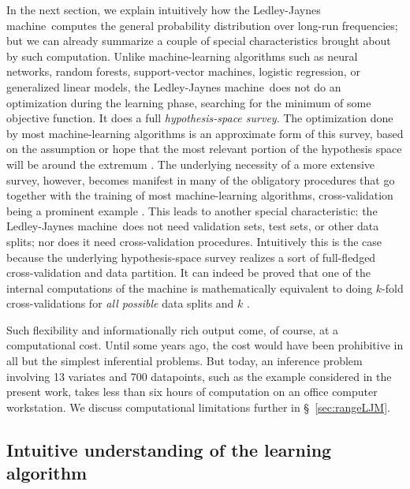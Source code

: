 \documentclass[utf8]{FrontiersinHarvard} %
\newcommand*{\sect}{\S}%
\newcommand*{\sects}{\S\S}%
\newcommand*{\chap}{ch.}%
\renewcommand*{\|}[1][]{\nonscript\:#1\vert\nonscript\:\mathopen{}}
\newcommand*{\ljm}{Ledley-Jaynes machine}
\begin{document}
In the next section, we explain intuitively how the \ljm\ computes the general probability distribution over long-run frequencies; but we can already summarize a couple of special characteristics brought about by such computation. Unlike machine-learning algorithms such as neural networks, random forests, support-vector machines, logistic regression, or generalized linear models, the \ljm\ does not do an optimization during the learning phase, searching for the minimum of some objective function. It does a full \emph{hypothesis-space survey}. %
The optimization done by most machine-learning algorithms is an approximate form of this survey, based on the assumption or hope that the most relevant portion of the hypothesis space will be around the extremum \citetext{\citealp[\chap~16]{mackay1992,murphy2012}; \citealp[see also][]{selfetal1987}}. The underlying necessity of a more extensive survey, however, becomes manifest in many of the obligatory procedures that go together with the training of most machine-learning algorithms, cross-validation being a prominent example \citep{mackay1992b}. This leads to another special characteristic: the \ljm\ does not need validation sets, test sets, or other data splits; nor does it need cross-validation procedures. Intuitively this is the case because the underlying hypothesis-space survey realizes a sort of full-fledged cross-validation and data partition. It can indeed be proved that one of the internal computations of the machine is mathematically equivalent to doing $k$-fold cross-validations for \emph{all possible} data splits and $k$ \citep{portamana2019b,fongetal2020}.

Such flexibility and informationally rich output come, of course, at a computational cost. Until some years ago, the cost would have been prohibitive in all but the simplest inferential problems. But today, an inference problem involving 13 variates and 700 datapoints, such as the example considered in the present work, takes less than six hours of computation on an office computer workstation. We discuss computational limitations further in \sect~\ref{sec:rangeLJM}.

\subsection{Intuitive understanding of the learning algorithm}
\label{sec:the_machine_learning}
\end{document}
